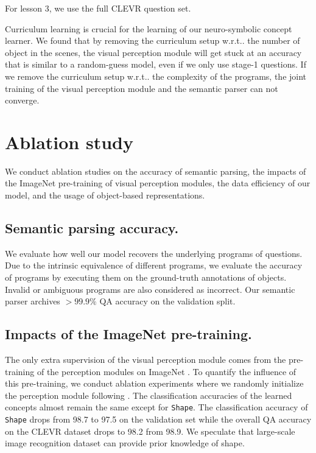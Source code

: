 \documentclass{article} \usepackage{iclr2019_conference,times}
\makeatletter
\DeclareRobustCommand\onedot{\futurelet\@let@token\@onedot}
\def\@onedot{\ifx\@let@token.\else.\null\fi\xspace}
\def\wrt{w.r.t\onedot} \def\dof{d.o.f\onedot}
\newcommand{\modelfull}{neuro-symbolic concept learner\xspace}
\makeatother
\begin{document}
For lesson 3, we use the full CLEVR question set.

Curriculum learning is crucial for the learning of our \modelfull. We found that by removing the curriculum setup \wrt the number of object in the scenes, the visual perception module will get stuck at an accuracy that is similar to a random-guess model, even if we only use stage-1 questions. If we remove the curriculum setup \wrt the complexity of the programs, the joint training of the visual perception module and the semantic parser can not converge.

\section{Ablation study}
\label{sec:app:visualization}
We conduct ablation studies on the accuracy of semantic parsing, the impacts of the ImageNet pre-training of visual perception modules, the data efficiency of our model, and the usage of object-based representations.

\subsection{Semantic parsing accuracy.}
We evaluate how well our model recovers the underlying programs of questions. Due to the intrinsic equivalence of different programs, we evaluate the accuracy of programs by executing them on the ground-truth annotations of objects. Invalid or ambiguous programs are also considered as incorrect. Our semantic parser archives $> 99.9\%$ QA accuracy on the validation split.

\subsection{Impacts of the ImageNet pre-training.} The only extra supervision of the visual perception module comes from the pre-training of the perception modules on ImageNet \citep{Deng2009Imagenet}.  To quantify the influence of this pre-training, we conduct ablation experiments where we randomly initialize the perception module following \citet{He2015Deep}. The classification accuracies of the learned concepts almost remain the same except for \texttt{Shape}. The classification accuracy of \texttt{Shape} drops from 98.7 to 97.5 on the validation set while the overall QA accuracy on the CLEVR dataset drops to 98.2 from 98.9. We speculate that large-scale image recognition dataset can provide prior knowledge of shape.
\end{document}

